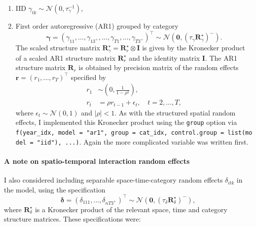 \documentclass[a4paper, nobind]{templates/ociamthesis}
\providecommand{\tightlist}{%
  \setlength{\itemsep}{0pt}\setlength{\parskip}{0pt}}
\begin{document}
\begin{enumerate}
\def\labelenumi{\arabic{enumi}.}
\tightlist
\item
  IID \(\gamma_{tk} \sim \mathcal{N}(0, \tau_\gamma^{-1})\),
\item
  First order autoregressive (AR1) grouped by category
  \[
  \boldsymbol{\mathbf{\gamma}} = (\gamma_{11}, \ldots, \gamma_{13^{+}}, \ldots, \gamma_{T1}, \ldots, \gamma_{T3^{+}})^\top \sim \mathcal{N}(\mathbf{0}, (\tau_\gamma \mathbf{R}^\star_\gamma)^{-}).
  \]
  The scaled structure matrix \(\mathbf{R}^\star_\gamma = \mathbf{R}^\star_r \otimes \mathbf{I}\) is given by the Kronecker product of a scaled AR1 structure matrix \(\mathbf{R}^\star_r\) and the identity matrix \(\mathbf{I}\).
  The AR1 structure matrix \(\mathbf{R}_r\) is obtained by precision matrix of the random effects \(\mathbf{r} = (r_1, \ldots, r_T)^\top\) specified by
  \begin{align}
  r_1 &\sim \left( 0, \frac{1}{1 - \rho^2} \right), \\
  r_t &= \rho r_{t - 1} + \epsilon_t, \quad t = 2, \ldots, T, 
  \end{align}
  where \(\epsilon_t \sim \mathcal{N}(0, 1)\) and \(|\rho| < 1\).
  As with the structured spatial random effects, I implemented this Kronecker product using the \texttt{group} option via \texttt{f(year\_idx,\ model\ =\ "ar1",\ group\ =\ cat\_idx,\ control.group\ =\ list(model\ =\ "iid"),\ ...)}.
  Again the more complicated variable was written first.
\end{enumerate}

\hypertarget{a-note-on-spatio-temporal-interaction-random-effects}{%
\paragraph{A note on spatio-temporal interaction random effects}\label{a-note-on-spatio-temporal-interaction-random-effects}}

I also considered including separable space-time-category random effects \(\delta_{itk}\) in the model, using the specification
\begin{equation}
    \boldsymbol{\mathbf{\delta}} = (\delta_{111}, \ldots, \delta_{nT3^{+}})^\top \sim \mathcal{N}(\mathbf{0}, (\tau_\delta \mathbf{R}^\star_\delta)^{-}),
\end{equation}
where \(\mathbf{R}^\star_\delta\) is a Kronecker product of the relevant space, time and category structure matrices.
These specifications were:
\end{document}
